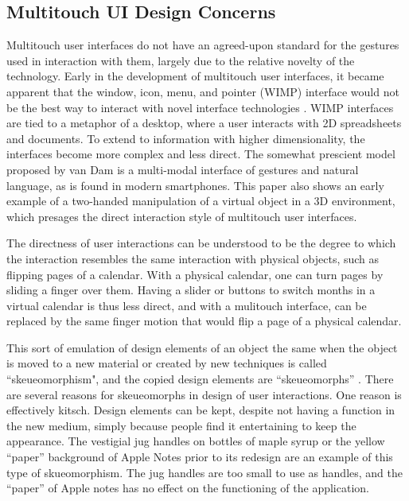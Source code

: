 \subsection{Multitouch UI Design Concerns} \label{section:Multitouch_UI_Design_Concerns}
Multitouch user interfaces do not have an agreed-upon standard for the gestures used in interaction with them, largely due to the relative novelty of the technology. 
Early in the development of multitouch user interfaces, it became apparent that the window, icon, menu, and pointer (WIMP) interface would not be the best way to interact with novel interface technologies \citep{van1997post}. 
WIMP interfaces are tied to a metaphor of a desktop, where a user interacts with 2D spreadsheets and documents. 
To extend to information with higher dimensionality, the interfaces become more complex and less direct. 
The somewhat prescient model proposed by van Dam is a multi-modal interface of gestures and natural language, as is found in modern smartphones. 
This paper also shows an early example of a two-handed manipulation of a virtual object in a 3D environment, which presages the direct interaction style of multitouch user interfaces. 

The directness of user interactions can be understood to be the degree to which the interaction resembles the same interaction with physical objects, such as flipping pages of a calendar. 
With a physical calendar, one can turn pages by sliding a finger over them. 
Having a slider or buttons to switch months in a virtual calendar is thus less direct, and with a mulitouch interface, can be replaced by the same finger motion that would flip a page of a physical calendar.

This sort of emulation of design elements of an object the same when the object is moved to a new material or created by new techniques is called ``skeueomorphism", and the copied design elements are ``skeueomorphs'' \citep{gross2014skeu}. 
There are several reasons for skeueomorphs in design of user interactions. 
One reason is effectively kitsch. 
Design elements can be kept, despite not having a function in the new medium, simply because people find it entertaining to keep the appearance.
The vestigial jug handles on bottles of maple syrup or the yellow ``paper'' background of Apple Notes prior to its redesign are an example of this type of skueomorphism.
The jug handles are too small to use as handles, and the ``paper'' of Apple notes has no effect on the functioning of the application. 

